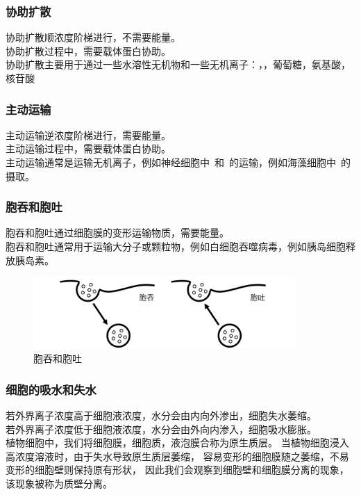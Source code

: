 \documentclass[UTF8]{ctexart}
\begin{document}
\subsubsection{协助扩散}
    协助扩散顺浓度阶梯进行，不需要能量。\\[3mm]
    协助扩散过程中，需要载体蛋白协助。\\[3mm]
    协助扩散主要用于通过一些水溶性无机物和一些无机离子：，，葡萄糖，氨基酸，核苷酸

\subsubsection{主动运输}
    主动运输逆浓度阶梯进行，需要能量。\\[3mm]
    主动运输过程中，需要载体蛋白协助。\\[3mm]
    主动运输通常是运输无机离子，例如神经细胞中~和~的运输，例如海藻细胞中~的摄取。

\subsubsection{胞吞和胞吐}
    胞吞和胞吐通过细胞膜的变形运输物质，需要能量。\\[3mm]
    胞吞和胞吐通常用于运输大分子或颗粒物，例如白细胞吞噬病毒，例如胰岛细胞释放胰岛素。\vspace{15pt}
    \begin{figure}[h]
        \begin{center}
            \includegraphics[width=10cm]{BiologyImage/3.jpg}
            \caption{胞吞和胞吐}
       \end{center}
    \end{figure}


\newpage
    
    \subsubsection{细胞的吸水和失水}
    若外界离子浓度高于细胞液浓度，水分会由内向外渗出，细胞失水萎缩。\\[3mm]
    若外界离子浓度低于细胞液浓度，水分会由外向内渗入，细胞吸水膨胀。\\[3mm]
    植物细胞中，我们将细胞膜，细胞质，液泡膜合称为原生质层。
    当植物细胞浸入高浓度溶液时，由于失水导致原生质层萎缩，
    容易变形的细胞膜随之萎缩，不易变形的细胞壁则保持原有形状，
    因此我们会观察到细胞壁和细胞膜分离的现象，该现象被称为质壁分离。\\
    
\end{document}
